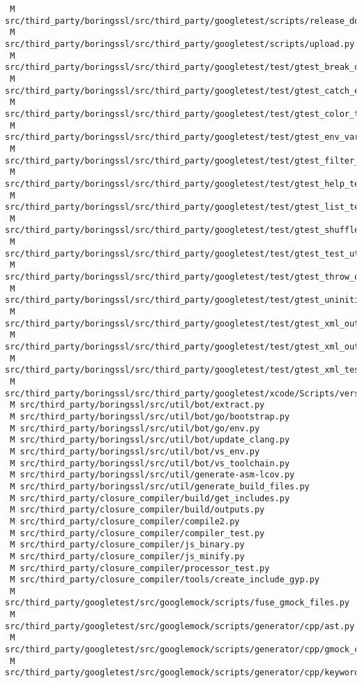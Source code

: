 \documentclass{article}
\begin{document}
\begin{verbatim}
 M src/third_party/boringssl/src/third_party/googletest/scripts/release_docs.py
 M src/third_party/boringssl/src/third_party/googletest/scripts/upload.py
 M src/third_party/boringssl/src/third_party/googletest/test/gtest_break_on_failure_unittest.py
 M src/third_party/boringssl/src/third_party/googletest/test/gtest_catch_exceptions_test.py
 M src/third_party/boringssl/src/third_party/googletest/test/gtest_color_test.py
 M src/third_party/boringssl/src/third_party/googletest/test/gtest_env_var_test.py
 M src/third_party/boringssl/src/third_party/googletest/test/gtest_filter_unittest.py
 M src/third_party/boringssl/src/third_party/googletest/test/gtest_help_test.py
 M src/third_party/boringssl/src/third_party/googletest/test/gtest_list_tests_unittest.py
 M src/third_party/boringssl/src/third_party/googletest/test/gtest_shuffle_test.py
 M src/third_party/boringssl/src/third_party/googletest/test/gtest_test_utils.py
 M src/third_party/boringssl/src/third_party/googletest/test/gtest_throw_on_failure_test.py
 M src/third_party/boringssl/src/third_party/googletest/test/gtest_uninitialized_test.py
 M src/third_party/boringssl/src/third_party/googletest/test/gtest_xml_outfiles_test.py
 M src/third_party/boringssl/src/third_party/googletest/test/gtest_xml_output_unittest.py
 M src/third_party/boringssl/src/third_party/googletest/test/gtest_xml_test_utils.py
 M src/third_party/boringssl/src/third_party/googletest/xcode/Scripts/versiongenerate.py
 M src/third_party/boringssl/src/util/bot/extract.py
 M src/third_party/boringssl/src/util/bot/go/bootstrap.py
 M src/third_party/boringssl/src/util/bot/go/env.py
 M src/third_party/boringssl/src/util/bot/update_clang.py
 M src/third_party/boringssl/src/util/bot/vs_env.py
 M src/third_party/boringssl/src/util/bot/vs_toolchain.py
 M src/third_party/boringssl/src/util/generate-asm-lcov.py
 M src/third_party/boringssl/src/util/generate_build_files.py
 M src/third_party/closure_compiler/build/get_includes.py
 M src/third_party/closure_compiler/build/outputs.py
 M src/third_party/closure_compiler/compile2.py
 M src/third_party/closure_compiler/compiler_test.py
 M src/third_party/closure_compiler/js_binary.py
 M src/third_party/closure_compiler/js_minify.py
 M src/third_party/closure_compiler/processor_test.py
 M src/third_party/closure_compiler/tools/create_include_gyp.py
 M src/third_party/googletest/src/googlemock/scripts/fuse_gmock_files.py
 M src/third_party/googletest/src/googlemock/scripts/generator/cpp/ast.py
 M src/third_party/googletest/src/googlemock/scripts/generator/cpp/gmock_class.py
 M src/third_party/googletest/src/googlemock/scripts/generator/cpp/keywords.py

\end{verbatim}
\end{document}
